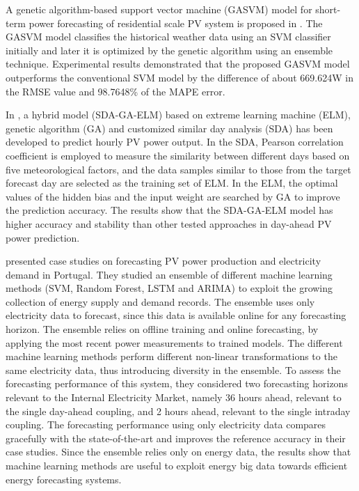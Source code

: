 A genetic algorithm-based support vector machine (GASVM) model for short-term power forecasting of residential scale PV system is proposed in \cite{VANDEVENTER2019367}.
The GASVM model classifies the historical weather data using an SVM classifier initially and later it is optimized by the genetic algorithm using an ensemble technique.
Experimental results demonstrated that the proposed GASVM model outperforms the conventional SVM model by the difference of about 669.624W in the RMSE value and 98.7648\% of the MAPE error.

In \cite{ZHOU2020117894}, a hybrid model (SDA-GA-ELM) based on extreme learning machine (ELM), genetic algorithm (GA) and customized similar day analysis (SDA) has been developed to predict hourly PV power output.
In the SDA, Pearson correlation coefficient is employed to measure the similarity between different days based on five meteorological factors, and the data samples similar to those from the target forecast day are selected as the training set of ELM.
In the ELM, the optimal values of the hidden bias and the input weight are searched by GA to improve the prediction accuracy.
The results show that the SDA-GA-ELM model has higher accuracy and stability than other tested approaches in day-ahead PV power prediction.

\cite{9248865} presented case studies on forecasting PV power production and electricity demand in Portugal.
They studied an ensemble of different machine learning methods (SVM, Random Forest, LSTM and ARIMA) to exploit the growing collection of energy supply and demand records.
The ensemble uses only electricity data to forecast, since this data is available online for any forecasting horizon.
The ensemble relies on offline training and online forecasting, by applying the most recent power measurements to trained models.
The different machine learning methods perform different non-linear transformations to the same electricity data, thus introducing diversity in the ensemble.
To assess the forecasting performance of this system, they considered two forecasting horizons relevant to the Internal Electricity Market, namely 36 hours ahead, relevant to the single day-ahead coupling, and 2 hours ahead, relevant to the single intraday coupling.
The forecasting performance using only electricity data compares gracefully with the state-of-the-art and improves the reference accuracy in their case studies.
Since the ensemble relies only on energy data, the results show that machine learning methods are useful to exploit energy big data towards efficient energy forecasting systems.

